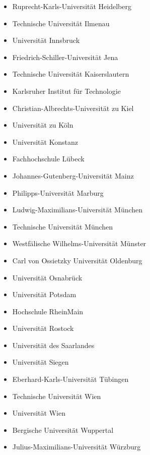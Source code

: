 \begin{itemize}
    \item Ruprecht-Karls-Universität Heidelberg
    \item Technische Universität Ilmenau
    \item Universität Innsbruck
    \item Friedrich-Schiller-Universität Jena
    \item Technische Universität Kaiserslautern
    \item Karlsruher Institut für Technologie
    \item Christian-Albrechts-Universität zu Kiel
    \item Universität zu Köln
    \item Universität Konstanz
    \item Fachhochschule Lübeck
    \item Johannes-Gutenberg-Universität Mainz
    \item Philipps-Universität Marburg
    \item Ludwig-Maximilians-Universität München
    \item Technische Universität München
    \item Westfälische Wilhelms-Universität Münster
    \item Carl von Ossietzky Universität Oldenburg
    \item Universität Osnabrück
    \item Universität Potsdam
    \item Hochschule RheinMain
    \item Universität Rostock
    \item Universität des Saarlandes
    \item Universität Siegen
    \item Eberhard-Karls-Universität Tübingen
    \item Technische Universität Wien
    \item Universität Wien
    \item Bergische Universität Wuppertal
    \item Julius-Maximilians-Universität Würzburg
  \end{itemize}
